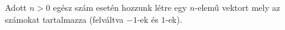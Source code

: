 Adott $n>0$ egész szám esetén hozzunk létre egy $n$-elemű vektort mely az
számokat tartalmazza (felváltva $-1$-ek és $1$-ek).



